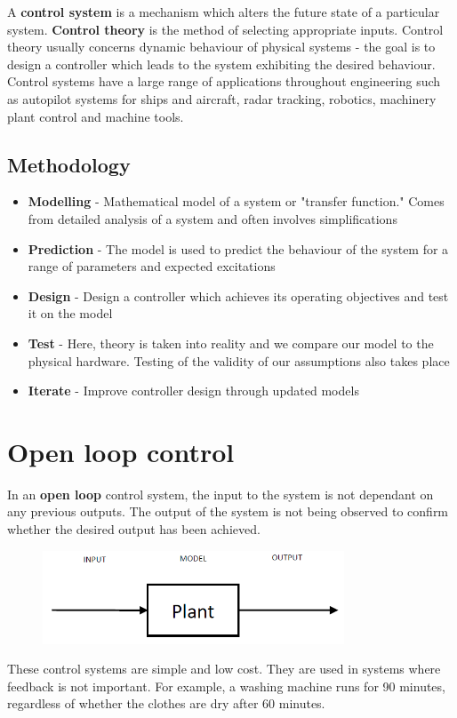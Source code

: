 \documentclass[class=report, crop=false, 12pt,a4paper]{standalone}
\begin{document}
A \textbf{control system} is a mechanism which alters the future state of a particular system. \textbf{Control theory} is the method of selecting appropriate inputs. Control theory usually concerns dynamic behaviour of physical systems - the goal is to design a controller which leads to the system exhibiting the desired behaviour. Control systems have a large range of applications throughout engineering such as autopilot systems for ships and aircraft, radar tracking, robotics, machinery plant control and machine tools. 
\subsection*{Methodology}
\begin{itemize}
  \item \textbf{Modelling} - Mathematical model of a system or "transfer function." Comes from detailed analysis of a system and often involves simplifications
  \item \textbf{Prediction} - The model is used to predict the behaviour of the system for a range of parameters and expected excitations
  \item \textbf{Design} - Design a controller which achieves its operating objectives and test it on the model
  \item \textbf{Test} - Here, theory is taken into reality and we compare our model to the physical hardware. Testing of the validity of our assumptions also takes place
  \item \textbf{Iterate} - Improve controller design through updated models
\end{itemize}
\section{Open loop control}
In an \textbf{open loop} control system, the input to the system is not dependant on any previous outputs. The output of the system is not being observed to confirm whether the desired output has been achieved. 
\begin{figure}[H]
  \centering
  \includegraphics[width = 0.8\textwidth]{../img/openloopcontrol.png}
\end{figure}
These control systems are simple and low cost. They are used in systems where feedback is not important. For example, a washing machine runs for 90 minutes, regardless of whether the clothes are dry after 60 minutes. 
\end{document}
